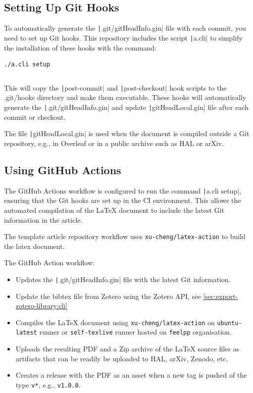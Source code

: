\documentclass[a4paper]{article}
\begin{document}
\subsection{Setting Up Git Hooks}

To automatically generate the \texttt|.git/gitHeadInfo.gin| file with each commit, you need to set up Git hooks.
This repository includes the script \texttt|a.cli| to simplify the installation of these hooks with the command:

\begin{verbatim}
./a.cli setup
\end{verbatim}

\inputminted[linenos,autogobble,bgcolor=background,fontsize=\small,firstline=6,lastline=23]{sh}{a.cli}

This will copy the \texttt|post-commit| and \texttt|post-checkout| hook scripts to the .git/hooks directory and make them executable.
These hooks will automatically generate the \texttt|.git/gitHeadInfo.gin| and update \texttt|gitHeadLocal.gin| file after each commit or checkout.

The file \texttt|gitHeadLocal.gin| is used when the document is compiled outside a Git repository, e.g., in Overleaf or in a public archive such as HAL or arXiv.


\subsection{Using GitHub Actions}

The GitHub Actions workflow is configured to run the command \texttt|a.cli setup|, ensuring that the Git hooks are set up in the CI environment.
This allows the automated compilation of the \LaTeX{} document to include the latest Git information in the article.

The template article repository workflow uses \citep{cheng_xu_xu-chenglatex-action_2024} \texttt{xu-cheng/latex-action} to build the latex document.

The GitHub Action workflow:
\begin{itemize}
    \item Updates the \texttt|.git/gitHeadInfo.gin| file with the latest Git information.
    \item Update the bibtex file from Zotero using the Zotero API, see \cref{sec:export-zotero-library:cli}
    \item Compiles the \LaTeX{} document using \texttt{xu-cheng/latex-action} on \texttt{ubuntu-latest} runner or \texttt{self-texlive} runner hosted on \texttt{feelpp} organisation.
    \item Uploads the resulting PDF and a Zip archive of the \LaTeX{} source files as artifacts that can be readily be uploaded to HAL, arXiv, Zenodo, etc.
    \item Creates a release with the PDF as an asset when a new tag is pushed of the type \texttt{v*}, e.g., \texttt{v1.0.0}.
\end{itemize}
\end{document}
